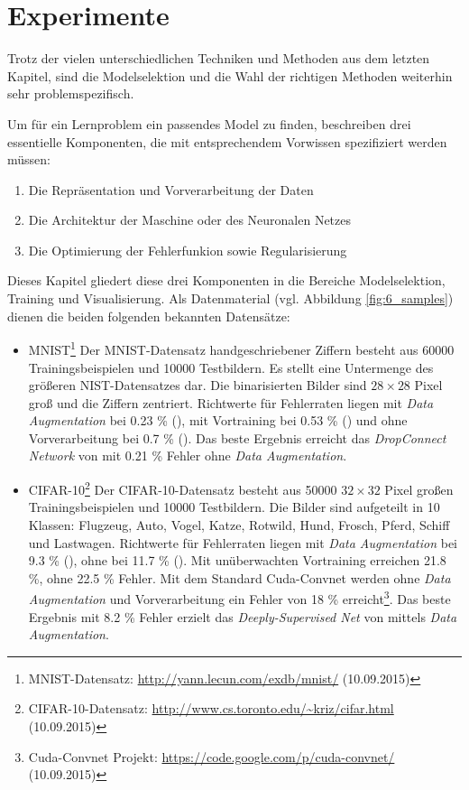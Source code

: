 \chapter{Experimente}
\label{ch:experiment}
Trotz der vielen unterschiedlichen Techniken und Methoden aus dem letzten Kapitel, sind die Modelselektion und die Wahl der richtigen Methoden weiterhin sehr problemspezifisch.

Um für ein Lernproblem ein passendes Model zu finden, beschreiben \cite{Bengio2007b} drei essentielle Komponenten, die mit entsprechendem Vorwissen spezifiziert werden müssen:
\begin{enumerate}
\item Die Repräsentation und Vorverarbeitung der Daten

\item Die Architektur der Maschine oder des Neuronalen Netzes

\item Die Optimierung der Fehlerfunkion sowie Regularisierung
\end{enumerate}

Dieses Kapitel gliedert diese drei Komponenten in die Bereiche Modelselektion, Training und Visualisierung. Als Datenmaterial (vgl. Abbildung \ref{fig:6_samples}) dienen die beiden folgenden bekannten Datensätze:

\begin{itemize}
\item MNIST\footnote{MNIST-Datensatz: \url{http://yann.lecun.com/exdb/mnist/} (10.09.2015)} \textemdash\space Der MNIST-Datensatz handgeschriebener Ziffern besteht aus 60000 Trainingsbeispielen und 10000 Testbildern. Es stellt eine Untermenge des größeren NIST-Datensatzes dar. Die binarisierten Bilder sind $28 \times 28$ Pixel groß und die Ziffern zentriert. Richtwerte für Fehlerraten liegen mit \textit{Data Augmentation} bei 0.23 \% (\cite{Ciresan2012}), mit Vortraining bei 0.53 \% (\cite{Jarrett2009}) und ohne Vorverarbeitung bei 0.7 \% (\cite{Ranzato2006}). Das beste Ergebnis erreicht das \textit{DropConnect Network} von \cite{Zeiler2013} mit 0.21 \% Fehler ohne \textit{Data Augmentation}.

\item CIFAR-10\footnote{CIFAR-10-Datensatz: \url{http://www.cs.toronto.edu/~kriz/cifar.html} (10.09.2015)} \textemdash\space Der CIFAR-10-Datensatz besteht aus 50000 $32 \times 32 $ Pixel großen Trainingsbeispielen und 10000 Testbildern. Die Bilder sind aufgeteilt in 10 Klassen: Flugzeug, Auto, Vogel, Katze, Rotwild, Hund, Frosch, Pferd, Schiff und Lastwagen. Richtwerte für Fehlerraten liegen mit \textit{Data Augmentation} bei 9.3 \% (\cite{Zeiler2013}), ohne bei 11.7 \% (\cite{Goodfellow_maxout_2013}). Mit unüberwachten Vortraining erreichen \cite{Masci2011} 21.8 \%, ohne 22.5 \% Fehler.  Mit dem Standard Cuda-Convnet werden ohne \textit{Data Augmentation} und Vorverarbeitung ein Fehler von 18 \% erreicht\footnote{Cuda-Convnet Projekt: \url{https://code.google.com/p/cuda-convnet/} (10.09.2015)}. Das beste Ergebnis mit 8.2 \% Fehler erzielt das \textit{Deeply-Supervised Net} von \cite{Lee2014} mittels \textit{Data Augmentation}.
\end{itemize}

